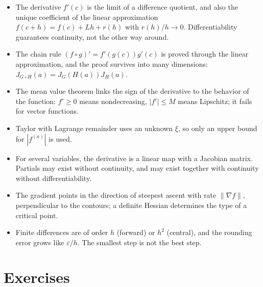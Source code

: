 \begin{ringkasan}
\begin{itemize}
  \item The derivative $f'(c)$ is the limit of a difference quotient, and also the unique
        coefficient of the linear approximation $f(c+h)=f(c)+Lh+r(h)$ with $r(h)/h\to0$.
        Differentiability guarantees continuity, not the other way around.
  \item The chain rule $(f\circ g)'=f'(g(c))g'(c)$ is proved through the linear approximation,
        and the proof survives into many dimensions: $J_{G\circ H}(a)=J_{G}(H(a))J_{H}(a)$.
  \item The mean value theorem links the sign of the derivative to the behavior of the
        function: $f'\ge0$ means nondecreasing, $|f'|\le M$ means Lipschitz; it fails for
        vector functions.
  \item Taylor with Lagrange remainder uses an unknown $\xi$, so only an upper bound for
        $|f^{(n)}|$ is used.
  \item For several variables, the derivative is a linear map with a Jacobian matrix. Partials
        may exist without continuity, and may exist together with continuity without
        differentiability.
  \item The gradient points in the direction of steepest ascent with rate $\|\nabla f\|$,
        perpendicular to the contours; a definite Hessian determines the type of a critical
        point.
  \item Finite differences are of order $h$ (forward) or $h^{2}$ (central), and the rounding
        error grows like $\varepsilon/h$. The smallest step is not the best step.
\end{itemize}
\end{ringkasan}

\section{Exercises}

